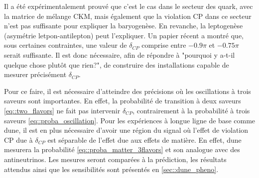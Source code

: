            Il a été expérimentalement prouvé que c'est le cas dans le secteur des quark\cite{Collaboration2006,Charles2004,Kobayashi1973}, avec la matrice de mélange CKM, mais également que la violation CP dans ce secteur n'est pas suffisante pour expliquer la baryogenèse\cite{Riotto1998}. En revanche, la leptogenèse (asymétrie letpon-antilepton) peut l'expliquer\cite{Davidson2008}. Un papier récent\cite{Buccella2018}  a montré que, sous certaines contraintes, une valeur de $\delta_{CP}$ comprise entre $-0.9\pi$ et $-0.75\pi$ serait suffisante. Il est donc nécessaire, afin de répondre à "pourquoi y a-t-il quelque chose plutôt que rien?", de construire des installations capable de mesurer précisément $\delta_{CP}$.
            
            Pour ce faire, il est nécessaire d'atteindre des précisions où les oscillations à trois saveurs sont importantes. En effet, la probabilité de transition à deux saveurs \eqref{eq::two_flavors} ne fait pas intervenir $\delta_{CP}$, contrairement à la probabilité à trois saveurs \eqref{eq::proba_oscillation}. Pour les expériences à longue ligne de base comme \gls{dune}, il est en plus nécessaire d'avoir une région du signal où l'effet de violation CP due à $\delta_{CP}$ est séparable de l'effet due aux effets de matière. En effet,  \gls{dune} mesurera la probabilité \eqref{eq::proba_matter_3flavors} et son analogue avec des antineutrinos. Les mesures seront comparées à la prédiction, les résultats attendus ainsi que les sensibilités sont présentés en \autoref{sec::dune_pheno}. 
        
        \printbibliography